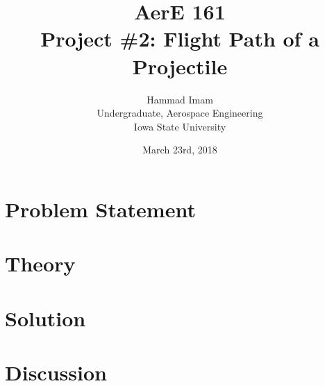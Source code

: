 \documentclass{article}
\title{AerE 161 \\ Project \#2: Flight Path of a Projectile}
\author{Hammad Imam \\ Undergraduate, Aerospace Engineering \\ Iowa State University}
\date{March 23rd,	2018}
\begin{document}
\begin{titlepage}
\maketitle
\end{titlepage}

\clearpage
\tableofcontents

\newpage

\section{Problem Statement}

\newpage
\section{Theory}

\newpage
\section{Solution}

\newpage
\section{Discussion}
\end{document}
